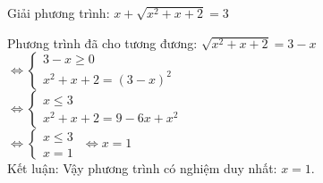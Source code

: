 \begin{baitap}
 Giải phương trình: $ x +\sqrt{x^2 + x + 2 } =3  $
\begin{loigiai1}
Phương trình đã cho tương đương: $ \sqrt{x^2 + x +2 } = 3 - x $ \\
$ \Leftrightarrow 
\begin{cases}
    3-x \geq 0 \\
    x^2 + x + 2 = (3-x )^2 
\end{cases} $ \\
$ \Leftrightarrow
\begin{cases}
    x \leq 3 \\
    x^2 + x + 2 = 9 -6x + x^2
\end{cases} $ \\
$ \Leftrightarrow 
\begin{cases}
    x \leq 3 \\
    x=1
\end{cases} $ 
$ \Leftrightarrow x=1 $ \\
Kết luận: Vậy phương trình có nghiệm duy nhất: $ x=1 $.
\end{loigiai1}

\end{baitap}
